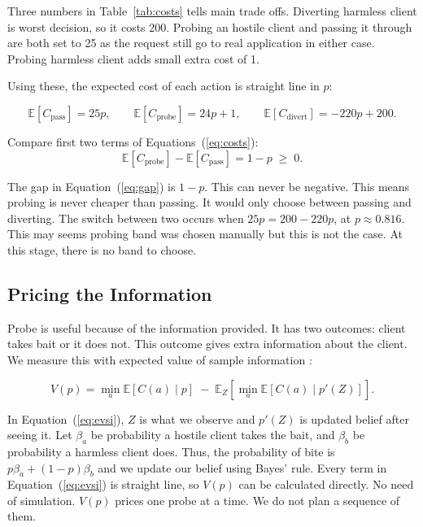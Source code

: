 \documentclass[runningheads]{llncs}
\begin{document}
Three numbers in Table~\ref{tab:costs} tells main trade offs. Diverting harmless client is worst decision, so it costs 200. Probing an hostile client and passing it through are both set to 25 as the request still go to real application in either case. Probing harmless client adds small extra cost of 1.

Using these, the expected cost of each action is straight line in $p$:

\begin{equation}
\mathbb{E}[C_{\text{pass}}] = 25p, \qquad
\mathbb{E}[C_{\text{probe}}] = 24p + 1, \qquad
\mathbb{E}[C_{\text{divert}}] = -220p + 200.
\label{eq:costs}
\end{equation}

Compare first two terms of Equations~(\ref{eq:costs}):
%
\begin{equation}
\mathbb{E}[C_{\text{probe}}] - \mathbb{E}[C_{\text{pass}}] = 1 - p \;\geq\; 0 .
\label{eq:gap}
\end{equation}

The gap in Equation~(\ref{eq:gap}) is $1-p$. This can never be negative. This means probing is never cheaper than passing. It would only choose between passing and diverting. The switch between two occurs when $25p = 200 - 220p$, at $p \approx 0.816$. This may seems probing band was chosen manually but this is not the case. At this stage, there is no band to choose. 

\subsection{Pricing the Information}
Probe is useful because of the information provided. It has two outcomes: client takes bait or it does not. This outcome gives extra information about the client. We measure this with expected value of sample information \cite{howard1966information}:

\begin{equation}
V(p) = \min_a \mathbb{E}[C(a) \mid p] \;-\;
       \mathbb{E}_Z\!\left[ \min_a \mathbb{E}[C(a) \mid p'(Z)] \right].
\label{eq:evsi}
\end{equation}

In Equation~(\ref{eq:evsi}), $Z$ is what we observe and $p'(Z)$ is updated belief after seeing it. Let $\beta_a$ be probability a hostile client takes the bait, and $\beta_b$ be probability a harmless client does. Thus, the probability of bite is $p\beta_a + (1-p)\beta_b$ and we update our belief using Bayes' rule. Every term in Equation~(\ref{eq:evsi}) is straight line, so $V(p)$ can be calculated directly. No need of simulation. $V(p)$ prices one probe at a time. We do not plan a sequence of
them.
\end{document}
